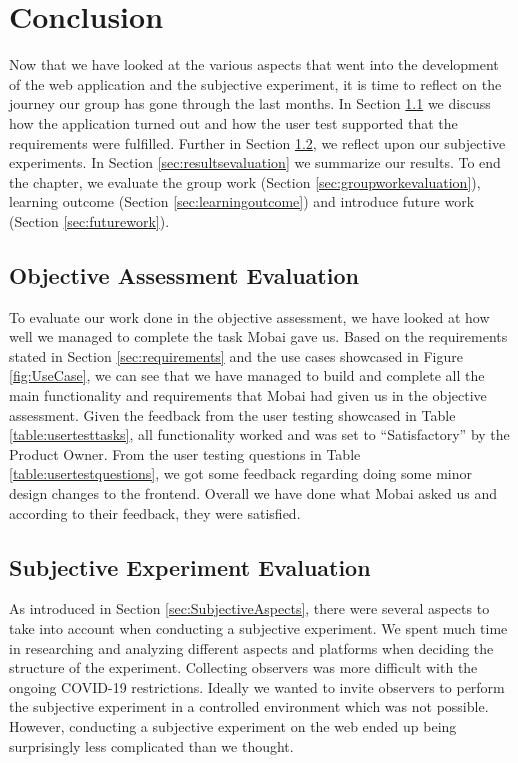 \chapter{Conclusion}
\label{chap:Conclusion}
 Now that we have looked at the various aspects that went into the development of the web application and the subjective experiment, it is time to reflect on the journey our group has gone through the last months. In Section \ref{sec:objective} we discuss how the application turned out and how the user test supported that the requirements were fulfilled. Further in Section \ref{sec:subjectiveevaluation}, we reflect upon our subjective experiments. In Section \ref{sec:resultsevaluation} we summarize our results. To end the chapter, we evaluate the group work (Section \ref{sec:groupworkevaluation}), learning outcome (Section \ref{sec:learningoutcome}) and introduce future work (Section \ref{sec:futurework}).

\section{Objective Assessment Evaluation}
\label{sec:objective}
To evaluate our work done in the objective assessment, we have looked at how well we managed to complete the task Mobai gave us. Based on the requirements stated in Section \ref{sec:requirements} and the use cases showcased in Figure \ref{fig:UseCase}, we can see that we have managed to build and complete all the main functionality and requirements that Mobai had given us in the objective assessment. Given the feedback from the user testing showcased in Table \ref{table:usertesttasks}, all functionality worked and was set to ``Satisfactory'' by the Product Owner. From the user testing questions in Table \ref{table:usertestquestions}, we got some feedback regarding doing some minor design changes to the frontend. Overall we have done what Mobai asked us and according to their feedback, they were satisfied. 

\section{Subjective Experiment Evaluation}
\label{sec:subjectiveevaluation}
As introduced in Section \ref{sec:SubjectiveAspects}, there were several aspects to take into account when conducting a subjective experiment. We spent much time in researching and analyzing different aspects and platforms when deciding the structure of the experiment. Collecting observers was more difficult with the ongoing COVID-19 restrictions. Ideally we wanted to invite observers to perform the subjective experiment in a controlled environment which was not possible. However, conducting a subjective experiment on the web ended up being surprisingly less complicated than we thought. 

